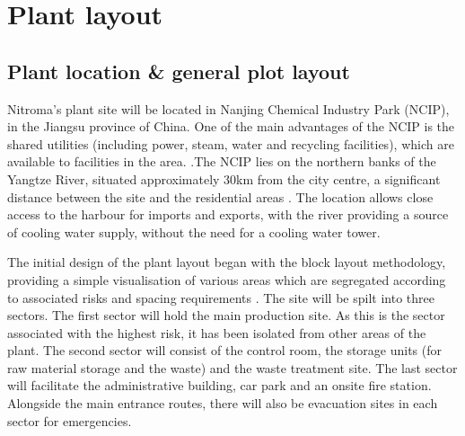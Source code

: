 \section{Plant layout}

\subsection{Plant location \& general plot layout}

Nitroma’s plant site will be located in Nanjing Chemical Industry Park (NCIP), in the Jiangsu province of China. One of the main advantages of the NCIP is the shared utilities (including power, steam, water and recycling facilities), which are available to facilities in the area. \cite{independent_commodity_intelligence_services_china_2007}.The NCIP lies on the northern banks of the Yangtze River, situated approximately 30km from the city centre, a significant distance between the site and the residential areas \cite{zeng_divergent_2011}. The location allows close access to the harbour for imports and exports, with the river providing a source of cooling water supply, without the need for a cooling water tower.    


The initial design of the plant layout began with the block layout methodology, providing a simple visualisation of various areas which are segregated according to associated risks and spacing requirements \cite{center_for_chemical_process_safety_site_2010}. The site will be spilt into three sectors. The first sector will hold the main production site. As this is the sector associated with the highest risk, it has been isolated from other areas of the plant. The second sector will consist of the control room, the storage units (for raw material storage and the waste) and the waste treatment site. The last sector will facilitate the administrative building, car park and an onsite fire station. Alongside the main entrance routes, there will also be evacuation sites in each sector for emergencies. 

